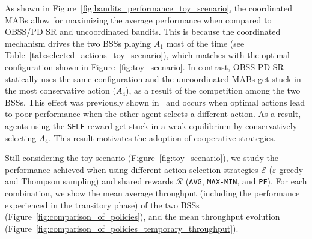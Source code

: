 \begin{table}[ht!]
\centering
\caption{Selected actions by uncoordinated (Uncoord-Bandit) and coordinated bandits (Coord-Bandit) in the toy scenario.}
\label{tab:selected_actions_toy_scenario}
\end{table}

As shown in Figure~\ref{fig:bandits_performance_toy_scenario}, the coordinated MABs allow for maximizing the average performance when compared to OBSS/PD SR and uncoordinated bandits. This is because the coordinated mechanism drives the two BSSs playing $A_1$ most of the time (see Table~\ref{tab:selected_actions_toy_scenario}), which matches with the optimal configuration shown in Figure~\ref{fig:toy_scenario}. In contrast, OBSS PD SR statically uses the same configuration and the uncoordinated MABs get stuck in the most conservative action ($A_4$), as a result of the competition among the two BSSs. This effect was previously shown in~\cite{wilhelmi2019collaborative} and occurs when optimal actions lead to poor performance when the other agent selects a different action. As a result, agents using the \texttt{SELF} reward get stuck in a weak equilibrium by conservatively selecting $A_4$. This result motivates the adoption of cooperative strategies.

Still considering the toy scenario (Figure~\ref{fig:toy_scenario}), we study the performance achieved when using different action-selection strategies $\mathcal{E}$ ($\varepsilon$-greedy and Thompson sampling) and shared rewards $\mathcal{R}$ (\texttt{AVG}, \texttt{MAX-MIN}, and \texttt{PF}). For each combination, we show the mean average throughput (including the performance experienced in the transitory phase) of the two BSSs (Figure~\ref{fig:comparison_of_policies}), and the mean throughput evolution (Figure~\ref{fig:comparison_of_policies_temporary_throughput}).

